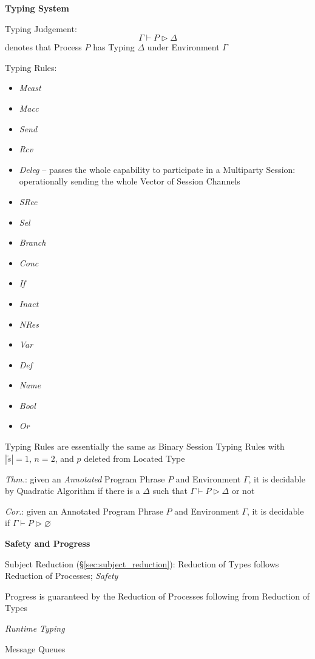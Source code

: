 \textbf{Typing System}

Typing Judgement:
\[
  \Gamma \vdash P \rhd \Delta
\]
denotes that Process $P$ has Typing $\Delta$ under Environment
$\Gamma$

Typing Rules:
\begin{itemize}
  \item \emph{Mcast}
  \item \emph{Macc}
  \item \emph{Send}
  \item \emph{Rcv}
  \item \emph{Deleg} -- passes the whole capability to participate in
    a Multiparty Session: operationally sending the whole Vector of
    Session Channels
  \item \emph{SRec}
  \item \emph{Sel}
  \item \emph{Branch}
  \item \emph{Conc}
  \item \emph{If}
  \item \emph{Inact}
  \item \emph{NRes}
  \item \emph{Var}
  \item \emph{Def}
  \item \emph{Name}
  \item \emph{Bool}
  \item \emph{Or}
\end{itemize}

\fist Typing Rules are essentially the same as Binary Session Typing
Rules with $|\tilde{s}| = 1$, $n = 2$, and $p$ deleted from Located
Type

\emph{Thm.}: given an \emph{Annotated} Program Phrase $P$ and
Environment $\Gamma$, it is decidable by Quadratic Algorithm if there
is a $\Delta$ such that $\Gamma \vdash P \rhd \Delta$ or not

\emph{Cor.}: given an Annotated Program Phrase $P$ and Environment
$\Gamma$, it is decidable if $\Gamma \vdash P \rhd \varnothing$


\textbf{Safety and Progress}

Subject Reduction (\S\ref{sec:subject_reduction}): Reduction of
Types follows Reduction of Processes; \emph{Safety}

Progress is guaranteed by the Reduction of Processes following from
Reduction of Types


\emph{Runtime Typing}

Message Queues

